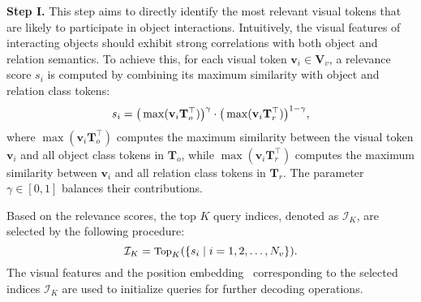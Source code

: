 \textbf{Step I.}  
This step aims to directly identify the most relevant visual tokens that are likely to participate in object interactions. Intuitively, the visual features of interacting objects should exhibit strong correlations with both object and relation semantics. To achieve this, for each visual token $\mathbf{v}_i \in \mathbf{V}_v$, a relevance score $s_i$ is computed by combining its maximum similarity with object and relation class tokens:
\begin{equation}
\small
\label{eq:step1}
    s_i = \big( \max(\mathbf{v}_i \mathbf{T}_{o}^\top) \big)^\gamma \cdot \big( \max(\mathbf{v}_i \mathbf{T}_{r}^\top) \big)^{1-\gamma},
\end{equation}
where $\max(\mathbf{v}_i \mathbf{T}_{o}^\top)$ computes the maximum similarity between the visual token $\mathbf{v}_i$ and all object class tokens in $\mathbf{T}_{o}$, while $\max(\mathbf{v}_i \mathbf{T}_{r}^\top)$ computes the maximum similarity between $\mathbf{v}_i$ and all relation class tokens in $\mathbf{T}_{r}$. The parameter $\gamma\in[0, 1]$ balances their contributions.


Based on the relevance scores, the top $K$ query indices, denoted as $\mathcal{I}_{K}$, are selected by the following procedure:
\begin{equation}
\small
    \mathcal{I}_{K} = \text{Top}_{K} ( \{ s_i \mid i = 1, 2, \dots, N_v \} ).
\end{equation}
The visual features and the position embedding~\cite{liu2023grounding} corresponding to the selected indices $\mathcal{I}_{K}$ are used to initialize queries for further decoding operations.

